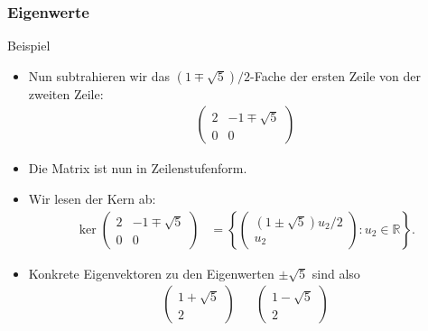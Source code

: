 \documentclass{beamer}
\newcommand\RR{\mathbb R}
\newcommand\cbc[1]{\left\{{#1}\right\}}
\newcommand{\mytitle}{Eigenwerte}
\begin{document}
\begin{frame}\frametitle{\mytitle}
	\begin{block}{Beispiel}
	\begin{itemize}
		\item Nun subtrahieren wir das $(1\mp\sqrt 5)/2$-Fache der ersten Zeile von der zweiten Zeile:
\begin{align*}
				\begin{pmatrix} 2&-1\mp\sqrt 5\\0&0 \end{pmatrix}
			\end{align*}
		\item Die Matrix ist nun in Zeilenstufenform.
		\item Wir lesen der Kern ab:
			\begin{align*}
				\ker\begin{pmatrix} 2&-1\mp\sqrt 5\\0&0 \end{pmatrix}&=
				\cbc{\begin{pmatrix}
						(1\pm\sqrt 5)u_2/2\\u_2
				\end{pmatrix}:u_2\in\RR}.
			\end{align*}
		\item Konkrete Eigenvektoren zu den Eigenwerten $\pm\sqrt 5$ sind also
			\begin{align*}
				\begin{pmatrix} 1+\sqrt 5\\2 \end{pmatrix}&&
			\begin{pmatrix} 1-\sqrt 5\\2 \end{pmatrix}
			\end{align*}
	\end{itemize}
	\end{block}
\end{frame}
\end{document}
